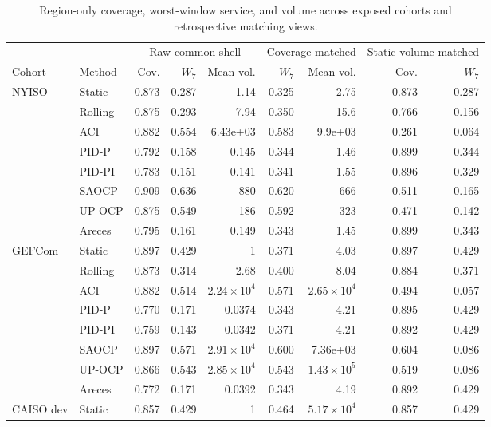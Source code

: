 
\begin{table}[!t]
\centering
\caption{Region-only coverage, worst-window service, and volume
across exposed cohorts and retrospective matching views.}
\label{tab:stratified}
\scriptsize
\setlength{\tabcolsep}{3.2pt}
\renewcommand{\arraystretch}{0.80}
\begin{tabular}{llrrr|rr|rr}
\toprule
& & \multicolumn{3}{c}{Raw common shell} & \multicolumn{2}{c}{Coverage matched} & \multicolumn{2}{c}{Static-volume matched} \\
\cmidrule(lr){3-5}\cmidrule(lr){6-7}\cmidrule(lr){8-9}
Cohort & Method & Cov. & $W_7$ & Mean vol. & $W_7$ & Mean vol. & Cov. & $W_7$ \\
\midrule
NYISO & Static & 0.873 & 0.287 & 1.14 & 0.325 & 2.75 & 0.873 & 0.287 \\
 & Rolling & 0.875 & 0.293 & 7.94 & 0.350 & 15.6 & 0.766 & 0.156 \\
 & ACI & 0.882 & 0.554 & 6.43e+03 & 0.583 & 9.9e+03 & 0.261 & 0.064 \\
 & PID-P & 0.792 & 0.158 & 0.145 & 0.344 & 1.46 & 0.899 & 0.344 \\
 & PID-PI & 0.783 & 0.151 & 0.141 & 0.341 & 1.55 & 0.896 & 0.329 \\
 & SAOCP & 0.909 & 0.636 & 880 & 0.620 & 666 & 0.511 & 0.165 \\
 & UP-OCP & 0.875 & 0.549 & 186 & 0.592 & 323 & 0.471 & 0.142 \\
 & Areces & 0.795 & 0.161 & 0.149 & 0.343 & 1.45 & 0.899 & 0.343 \\
\addlinespace[2pt]
GEFCom & Static & 0.897 & 0.429 & 1 & 0.371 & 4.03 & 0.897 & 0.429 \\
 & Rolling & 0.873 & 0.314 & 2.68 & 0.400 & 8.04 & 0.884 & 0.371 \\
 & ACI & 0.882 & 0.514 & $2.24\times10^{4}$ & 0.571 & $2.65\times10^{4}$ & 0.494 & 0.057 \\
 & PID-P & 0.770 & 0.171 & 0.0374 & 0.343 & 4.21 & 0.895 & 0.429 \\
 & PID-PI & 0.759 & 0.143 & 0.0342 & 0.371 & 4.21 & 0.892 & 0.429 \\
 & SAOCP & 0.897 & 0.571 & $2.91\times10^{4}$ & 0.600 & 7.36e+03 & 0.604 & 0.086 \\
 & UP-OCP & 0.866 & 0.543 & $2.85\times10^{4}$ & 0.543 & $1.43\times10^{5}$ & 0.519 & 0.086 \\
 & Areces & 0.772 & 0.171 & 0.0392 & 0.343 & 4.19 & 0.892 & 0.429 \\
\addlinespace[2pt]
CAISO dev & Static & 0.857 & 0.429 & 1 & 0.464 & $5.17\times10^{4}$ & 0.857 & 0.429 \\

\end{tabular}
\end{table}
